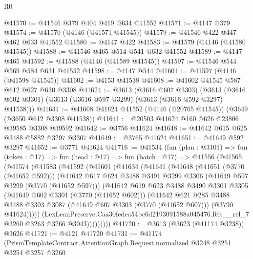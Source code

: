 \begin{lexlean}{R0}
\begin{coremodule}
@41570 := @41546 @379 @404 @419 @634 @41552
@41571 := @4147 @379
@41574 := @41570 (@4146 (@41571 @41545))
@41579 := @41546 @422 @447 @462 @633 @41552
@41580 := @4147 @422
@41583 := @41579 (@4146 (@41580 @41545))
@41588 := @41546 @465 @514 @541 @632 @41552
@41589 := @4147 @465
@41592 := @41588 (@4146 (@41589 @41545))
@41597 := @41546 @544 @569 @584 @631 @41552
@41598 := @4147 @544
@41601 := @41597 (@4146 (@41598 @41545))
@41602 := @4153 @41538
@41608 := @41602 @41545 @587 @612 @627 @630 @3308
@41624 := @3613
    (@3616 @607 @3303)
    (@3613 (@3616 @602 @3301) (@3613 (@3616 @597 @3299) (@3613 (@3616 @592 @3297) @41538)))
@41634 := @41608 @41624 @41552 (@4146 (@20765 @41545)) (@3649 (@3650 @612 @3308 @41538))
@41641 := @20503 @41624 @160 @626 @23806 @39585 @3308 @39592
@41642 := @3756 @41624
@41648 := @41642 @615 @625 @3488 @5882 @3297 @3307
@41649 := @3765 @41624
@41651 := @41649 @592 @3297
@41652 := @3771 @41624
@41716 := @41534
    (fun (plan : @3101) =>
    fun (token : @17) =>
    fun (head : @17) =>
    fun (batch : @17) =>
    @41556
      (@41565
        (@41574
          (@41583
            (@41592
              (@41601
                (@41634
                  (@41641
                    (@41648
                      (@41651 (@3770 (@41652 @592)))
                      (@41642
                        @617
                        @624
                        @3488
                        @3491
                        @3299
                        @3306
                        (@41649 @597 @3299 (@3770 (@41652 @597)))
                        (@41642
                          @619
                          @623
                          @3488
                          @3490
                          @3301
                          @3305
                          (@41649 @602 @3301 (@3770 (@41652 @602)))
                          (@41642
                            @621
                            @285
                            @3488
                            @3488
                            @3303
                            @3087
                            (@41649 @607 @3303 (@3770 (@41652 @607)))
                            (@3790 @41624)))))
                    (LexLeanPreserve.Caa30fedea54bc6d2193091588a045476.R0.__rel_7
                      @3260
                      @3263
                      @3266
                      @3043)))))))))
@41720 := @3613 (@3623 (@41174 @3238)) @3626
@41721 := @4121 @41720
@41731 := @41174
    (PrismTemplateContract.AttentionGraph.Request.normalized
      @3248
      @3251
      @3254
      @3257
      @3260

\end{coremodule}
\end{lexlean}
